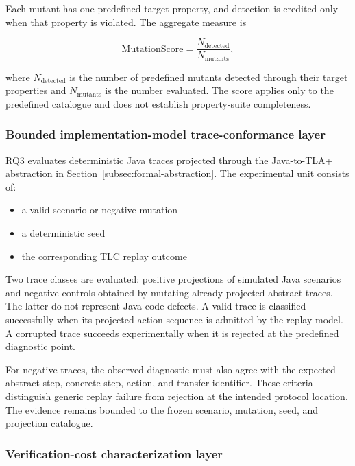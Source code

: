 Each mutant has one predefined target property, and detection is credited only
when that property is violated. The aggregate measure is

\begin{equation}
\mathrm{MutationScore}
=
\frac{N_{\mathrm{detected}}}
{N_{\mathrm{mutants}}},
\label{eq:mutation-score}
\end{equation}

where \(N_{\mathrm{detected}}\) is the number of predefined mutants detected
through their target properties and \(N_{\mathrm{mutants}}\) is the number
evaluated. The score applies only to the predefined catalogue and does not
establish property-suite completeness.

\subsubsection{Bounded implementation-model trace-conformance layer}

RQ3 evaluates deterministic Java traces projected through the Java-to-TLA+
abstraction in Section~\ref{subsec:formal-abstraction}. The experimental unit
consists of:

\begin{itemize}
\item a valid scenario or negative mutation
\item a deterministic seed
\item the corresponding TLC replay outcome
\end{itemize}

Two trace classes are evaluated: positive projections of simulated Java
scenarios and negative controls obtained by mutating already projected
abstract traces. The latter do not represent Java code defects. A valid trace is classified successfully when its projected action
sequence is admitted by the replay model. A corrupted trace succeeds
experimentally when it is rejected at the predefined diagnostic point.

For negative traces, the observed diagnostic must also agree with the expected
abstract step, concrete step, action, and transfer identifier. These criteria
distinguish generic replay failure from rejection at the intended protocol
location. The evidence remains bounded to the frozen scenario, mutation, seed,
and projection catalogue.

\subsubsection{Verification-cost characterization layer}


